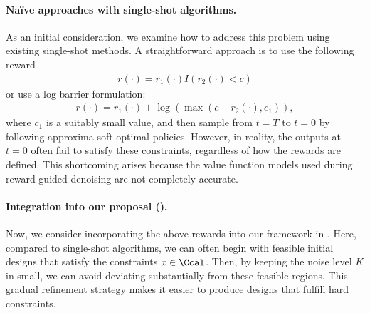 \vspace{-2mm}
\paragraph{Na\"ive approaches with single-shot algorithms.} As an initial consideration, we examine how to address this problem using existing single-shot methods. A straightforward approach is to use the following reward
\begin{align*}
    r(\cdot) = r_1(\cdot)I(r_2(\cdot)<c)  
\end{align*}
or use a log barrier formulation: 
\begin{align*}
    r(\cdot) =  r_1(\cdot) + \log (\max(c- r_2(\cdot),c_1)), 
\end{align*}
where $c_1$ is a suitably small value, and then sample from $t=T$ to $t=0$ by following approxima soft-optimal policies.  However, in reality, the outputs at $t=0$ often fail to satisfy these constraints, regardless of how the rewards are defined. This shortcoming arises because the value function models used during reward-guided denoising are not completely accurate.

\vspace{-2mm}
\paragraph{Integration into our proposal ().}

Now, we consider incorporating the above rewards into our framework in . Here, compared to single-shot algorithms, we can often begin with feasible initial designs that satisfy the constraints $x \in \Ccal$. Then, by keeping the noise level $K$ in  small, we can avoid deviating substantially from these feasible regions. This gradual refinement strategy makes it easier to produce designs that fulfill hard constraints.